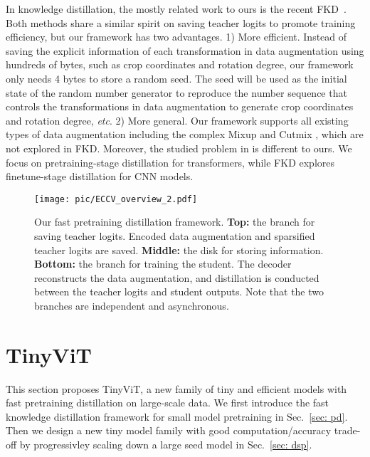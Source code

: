 \documentclass[runningheads]{llncs}
\begin{document}
In knowledge distillation, the mostly related work to ours is the recent FKD~\cite{fkd}. 
Both methods share a similar spirit on saving teacher logits to promote training efficiency, but our framework has two advantages. 1) More efficient. 
Instead of saving the explicit information of each transformation in data augmentation using hundreds of bytes, such as crop coordinates and rotation degree, our framework only needs 4 bytes to store a random seed. The seed will be used as the initial state of the random number generator to reproduce the number sequence that controls the transformations in data augmentation to generate crop coordinates and rotation degree, \emph{etc}.
2) More general. Our framework supports all existing types of data augmentation including the complex Mixup \cite{mixup} and Cutmix \cite{cutmix}, which are not explored in FKD. Moreover, the studied problem in \cite{fkd} is different to ours. We focus on pretraining-stage distillation for transformers, while FKD explores finetune-stage distillation for CNN models. 

\begin{figure*}[t]
  \centering
\texttt{[image: pic/ECCV\_overview\_2.pdf]}
\caption{Our fast pretraining distillation framework. \textbf{Top: }the branch for saving teacher logits. Encoded data augmentation and sparsified teacher logits are saved. \textbf{Middle: }the disk for storing information. \textbf{Bottom: }the branch for training the student. The decoder reconstructs the data augmentation, and distillation is conducted between the teacher logits and student outputs. Note that the two branches are independent and asynchronous.}
  \label{fig:framework}
  \vspace{-4mm}
\end{figure*}

\vspace{-5mm}
\section{TinyViT}
\vspace{-2mm}

This section proposes TinyViT, a new family of tiny and efficient models with fast pretraining distillation on large-scale data. We first introduce the fast knowledge distillation framework for small model pretraining in Sec.~\ref{sec: pd}. Then we design a new tiny model family with good computation/accuracy trade-off by progressivley scaling down a large seed model in Sec.~\ref{sec: dsp}.
\end{document}
